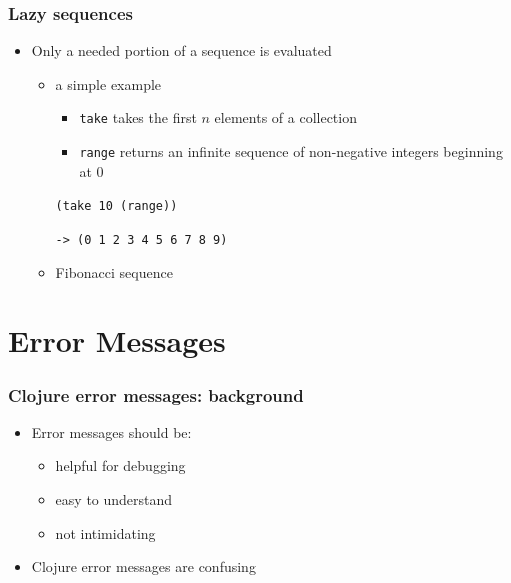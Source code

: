 \documentclass{beamer}
\begin{document}
\begin{frame}[fragile]
\frametitle{Lazy sequences}
	\begin{itemize}
  	  \item Only a needed portion of a sequence is evaluated
	  \begin{itemize}
  	     \item a simple example
  	     \begin{itemize}
  	         \item \texttt{take} takes the first $n$ elements of a collection
  	         \item \texttt{range} returns an infinite sequence of non-negative integers beginning at 0
  	     \end{itemize}
  	     \texttt{(take 10 (range))}
  	 	      
  	     \texttt{-> (0 1 2 3 4 5 6 7 8 9)}
  	     \item Fibonacci sequence
  	   \end{itemize}
   \end{itemize}
\end{frame}

\section{Error Messages}

\begin{frame}
\frametitle{Clojure error messages: background}
	\begin{itemize}
  		\item Error messages should be:
  		\begin{itemize}
  	 		\item helpful for debugging
  	 		\item easy to understand
  	 		\item not intimidating
  		\end{itemize}
  		\item Clojure error messages are confusing
	 \end{itemize}
	 
\end{frame}
\end{document}
